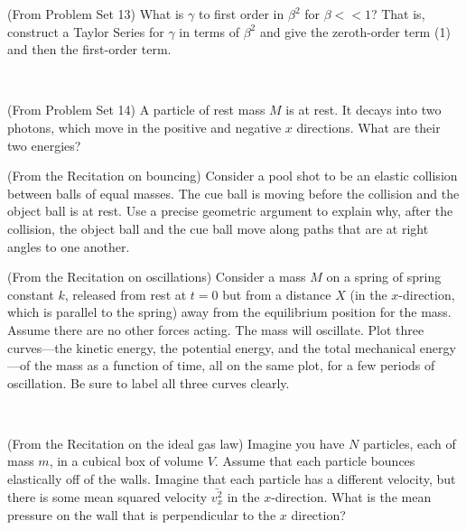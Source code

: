 \documentclass[12pt, letterpaper]{article}
\begin{document}
\vfill

\begin{problem} (From Problem Set 13)
  What is $\gamma$ to first order in $\beta^2$ for $\beta<< 1$?
  That is, construct a Taylor Series for $\gamma$ in terms of
  $\beta^2$ and give the zeroth-order term (1) and then the first-order
  term.
\end{problem}

\vfill
~\clearpage

\begin{problem} (From Problem Set 14)
  A particle of rest mass $M$ is at rest.
  It decays into two photons, which move in the positive and negative $x$ directions.
  What are their two energies?
\end{problem}

\vfill

\begin{problem} (From the Recitation on bouncing)
  Consider a pool shot to be an elastic collision between balls of equal
  masses. The cue ball is moving before the collision and the object
  ball is at rest. Use a precise geometric argument to explain why, after the collision, the
  object ball and the cue ball move along paths that are at right angles to one another.
\end{problem}

\vfill

\begin{problem} (From the Recitation on oscillations)
  Consider a mass $M$ on a spring of spring constant $k$, released from
  rest at $t=0$ but from a distance $X$ (in the $x$-direction, which is
  parallel to the spring) away from the equilibrium position for the
  mass.  Assume there are no other forces acting.
  The mass will oscillate.
  Plot three curves---the kinetic energy, the potential energy, and the total
  mechanical energy---of the mass as a function of time, all on the same plot,
  for a few periods of oscillation.
  Be sure to label all three curves clearly.
\end{problem}

\vfill
~\clearpage

\begin{problem} (From the Recitation on the ideal gas law)
  Imagine you have $N$ particles, each of mass $m$, in a cubical box of volume $V$.
  Assume that each particle bounces elastically off of the walls.
  Imagine that each particle has a different velocity, but there is some
  mean squared velocity $\bar{v_x^2}$ in the $x$-direction. What is the
  mean pressure on the wall that is perpendicular to the $x$ direction?
\end{problem}
\end{document}
